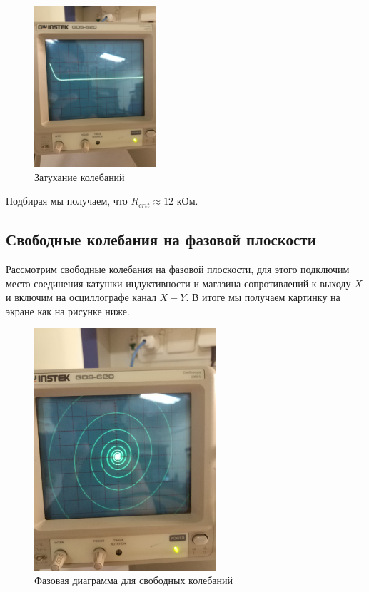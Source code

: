 \documentclass[a4paper, 12pt]{article}%
\begin{document}
\begin{figure}[h]
\begin{center}
\includegraphics[width = 0.4\textwidth]{2.jpg}
\caption{Затухание колебаний}
\end{center}
\end{figure}

Подбирая мы получаем, что $R_{crit} \approx 12$ кОм.
\newpage
\subsection{Свободные колебания на фазовой плоскости}
Рассмотрим свободные колебания на фазовой плоскости, для этого подключим место соединения катушки индуктивности и магазина сопротивлений к выходу $X$ и включим на осциллографе канал $X-Y$. В итоге мы получаем картинку на экране как на рисунке ниже. 
\begin{figure}[h!]
\begin{center}
\includegraphics[width = 0.6\textwidth]{1.jpg}
\caption{Фазовая диаграмма для свободных колебаний}
\end{center}
\end{figure}
\end{document}
